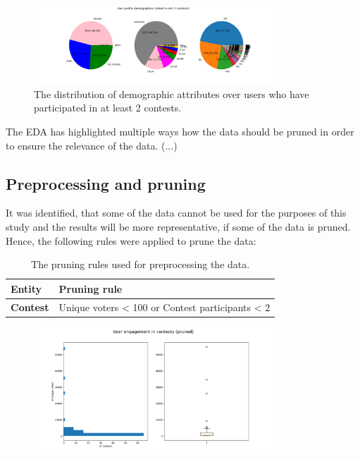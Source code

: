 \begin{figure}[h] 
    \begin{center}
        \includegraphics[width=0.8\textwidth]{Images/user_demographics_distribution-pruned}
        \caption{The distribution of demographic attributes over users who have participated in at least 2 contests.}
        \label{user_demographics_distribution-pruned}
    \end{center}
\end{figure}

The EDA has highlighted multiple ways how the data should be pruned in order to ensure the relevance of the data. (...)

\subsection{Preprocessing and pruning}
It was identified, that some of the data cannot be used for the purposes of this study and the results will be more representative, if some of the data is pruned. Hence, the following rules were applied to prune the data:

\begin {table}[]
    \centering
    \begin{tabular}{l|l}
        \textbf{Entity}              & \textbf{Pruning rule} \\
        \hline
        \textbf{Contest}             & Unique voters < 100 or Contest participants < 2
    \end{tabular}
    \caption{The pruning rules used for preprocessing the data.}
    \label{contest_preprocessing_rules}
\end{table}

\begin{figure}[h] 
    \begin{center}
        \includegraphics[width=0.8\textwidth]{Images/user_engagement_in_contests-pruned.png}
        \caption{}
        \label{}
    \end{center}
\end{figure}

